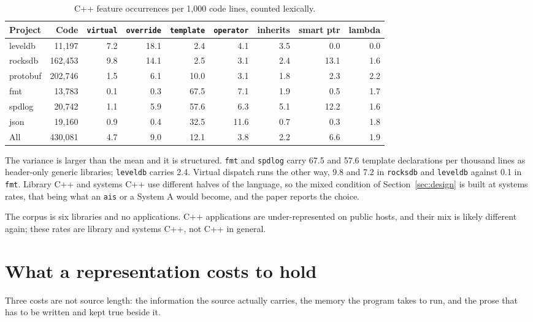 \documentclass[11pt,a4paper]{article}
\begin{document}
\begin{table}[H]
\centering
\small
\setlength{\tabcolsep}{4pt}
\begin{tabular}{lrrrrrrrr}
\toprule
Project & Code & \texttt{virtual} & \texttt{override} & \texttt{template} & \texttt{operator} & inherits & smart ptr & lambda \\
\midrule
leveldb & 11,197 & 7.2 & 18.1 & 2.4 & 4.1 & 3.5 & 0.0 & 0.0 \\
rocksdb & 162,453 & 9.8 & 14.1 & 2.5 & 3.1 & 2.4 & 13.1 & 1.6 \\
protobuf & 202,746 & 1.5 & 6.1 & 10.0 & 3.1 & 1.8 & 2.3 & 2.2 \\
fmt & 13,783 & 0.1 & 0.3 & 67.5 & 7.1 & 1.9 & 0.5 & 1.7 \\
spdlog & 20,742 & 1.1 & 5.9 & 57.6 & 6.3 & 5.1 & 12.2 & 1.6 \\
json & 19,160 & 0.9 & 0.4 & 32.5 & 11.6 & 0.7 & 0.3 & 1.8 \\
\midrule
All & 430,081 & 4.7 & 9.0 & 12.1 & 3.8 & 2.2 & 6.6 & 1.9 \\
\bottomrule
\end{tabular}
\caption{C++ feature occurrences per 1,000 code lines, counted lexically.}
\label{tab:cppfeat}
\end{table}

The variance is larger than the mean and it is structured. \texttt{fmt} and \texttt{spdlog} carry 67.5 and 57.6 template declarations per thousand lines as header-only generic libraries; \texttt{leveldb} carries 2.4. Virtual dispatch runs the other way, 9.8 and 7.2 in \texttt{rocksdb} and \texttt{leveldb} against 0.1 in \texttt{fmt}. Library C++ and systems C++ use different halves of the language, so the mixed condition of Section~\ref{sec:design} is built at systems rates, that being what an \texttt{ais} or a System A would become, and the paper reports the choice.

The corpus is six libraries and no applications. C++ applications are under-represented on public hosts, and their mix is likely different again; these rates are library and systems C++, not C++ in general.

\section{What a representation costs to hold}
\label{sec:hold}

Three costs are not source length: the information the source actually carries, the memory the program takes to run, and the prose that has to be written and kept true beside it.
\end{document}
